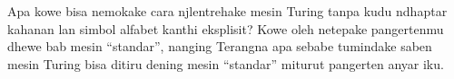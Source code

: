 \documentclass[../../../include/open-logic-section]{subfiles}
\begin{document}
\begin{prob}
  Apa kowe bisa nemokake cara njlentrehake mesin
  Turing tanpa kudu ndhaptar kahanan lan simbol
  alfabet kanthi eksplisit? Kowe oleh netepake
  pangertenmu dhewe bab mesin ``standar'', nanging
 Terangna apa sebabe tumindake saben mesin Turing
  bisa ditiru dening mesin ``standar'' miturut
  pangerten anyar iku.
\end{prob}
\end{document}
